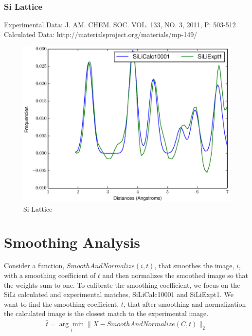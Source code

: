 \documentclass[12pt,letterpaper]{article}
\begin{document}
\subsubsection{Si Lattice}
\noindent Experimental Data: J. AM. CHEM. SOC. VOL. 133, NO. 3, 2011, P:
503-512\\
\noindent Calculated Data: http://materialsproject.org/materials/mp-149/ \\
\begin{figure}[ht]
  \begin{center}
    \includegraphics[scale=0.7]{figs/SmoothCalibrationSiLiCalc10001-SiLiExpt1.eps}
    \caption{Si Lattice}
  \end{center}
\end{figure}
\pagebreak

\section{Smoothing Analysis}
Consider a function, $SmoothAndNormalize(i, t)$, that smoothes the image, $i$,
with a smoothing coefficient of $t$ and then normalizes the smoothed image so
that the weights sum to one. To calibrate the smoothing coefficient, we focus on
the SiLi calculated and experimental matches, SiLiCalc10001 and SiLiExpt1. We
want to find the smoothing coefficient, $t$, that after smoothing and
normalization the calculated image is the closest match to the experimental
image.
\begin{align*}
  \hat{t} = \underset{t}{\arg\min} \| X -
    SmoothAndNormalize(C, t) \|_2
\end{align*}
\end{document}
